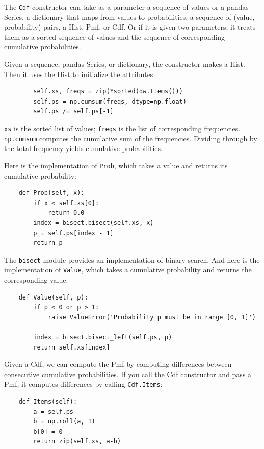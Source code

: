 \documentclass[12pt]{book}
\begin{document}
The {\tt Cdf} constructor can take as a parameter a sequence of values
or a pandas Series, a dictionary that maps from values to
probabilities, a sequence of (value, probability) pairs, a Hist, Pmf,
or Cdf.  Or if it is given two parameters, it treats them as a sorted
sequence of values and the sequence of corresponding cumulative
probabilities.

Given a sequence, pandas Series, or dictionary, the constructor makes
a Hist.  Then it uses the Hist to initialize the attributes:

\begin{verbatim}
        self.xs, freqs = zip(*sorted(dw.Items()))
        self.ps = np.cumsum(freqs, dtype=np.float)
        self.ps /= self.ps[-1]
\end{verbatim}

{\tt xs} is the sorted list of values; {\tt freqs} is the list
of corresponding frequencies.  {\tt np.cumsum} computes
the cumulative sum of the frequencies.  Dividing through by the
total frequency yields cumulative probabilities.

Here is the implementation of {\tt Prob}, which takes a value
and returns its cumulative probability: 

\begin{verbatim}
    def Prob(self, x):
        if x < self.xs[0]:
            return 0.0
        index = bisect.bisect(self.xs, x)
        p = self.ps[index - 1]
        return p
\end{verbatim}

The {\tt bisect} module provides an implementation of binary search.
And here is the implementation of {\tt Value}, which takes a
cumulative probability and returns the corresponding value:

\begin{verbatim}
    def Value(self, p):
        if p < 0 or p > 1:
            raise ValueError('Probability p must be in range [0, 1]')

        index = bisect.bisect_left(self.ps, p)
        return self.xs[index]
\end{verbatim}

Given a Cdf, we can compute the Pmf by computing differences between
consecutive cumulative probabilities.  If you call the Cdf constructor
and pass a Pmf, it computes differences by calling {\tt Cdf.Items}:

\begin{verbatim}
    def Items(self):
        a = self.ps
        b = np.roll(a, 1)
        b[0] = 0
        return zip(self.xs, a-b)
\end{verbatim}
\end{document}
